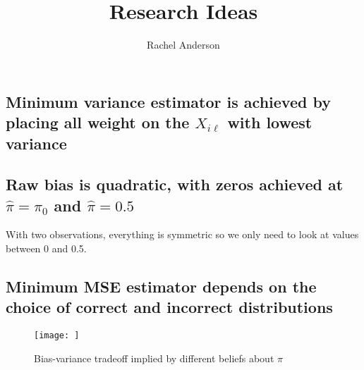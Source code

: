 \documentclass[11pt]{amsart}
\title{Research Ideas}
\author{Rachel Anderson}
\begin{document}
\subsection*{Minimum variance estimator is achieved by placing all weight on the $X_{i\ell}$ with lowest variance}

\subsection*{Raw bias is quadratic, with zeros achieved at $\hat{\pi}=\pi_0$ and $\hat{\pi}=0.5$}

With two observations, everything is symmetric so we only need to look at values between 0 and 0.5.

\subsection*{Minimum MSE estimator depends on the choice of correct and incorrect distributions}

\begin{figure}[h!]
    \centering
    \texttt{[image: ]}
    \caption{Bias-variance tradeoff implied by different beliefs about $\pi$}
    \label{fig:my_label}
\end{figure}
\end{document}
